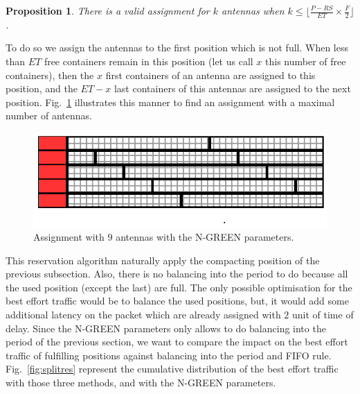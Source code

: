 \documentclass[10pt, conference, letterpaper]{IEEEtran}
\newtheorem{prop}{Proposition}
\begin{document}
\begin{prop}
 There is a valid assignment for $k$ antennas when $k \leq \lfloor \frac{P- RS}{ET} \times \frac{F}{2}\rfloor$.
\end{prop}


To do so we assign the antennas to the first position which is not full. When less than $ET$ free containers remain in this position (let us call $x$ this number of free containers), then the $x$ first containers of an antenna are assigned to this position, and the $ET - x$ last containers of this antennas are assigned to the next position. Fig.~\ref{fig:split} illustrates this manner to find an assignment with a maximal number of antennas. 


\begin{figure}[h!]
\begin{center}   

      \includegraphics[scale=0.8]{split}
     \caption{Assignment with $9$ antennas with the N-GREEN parameters.}   \label{fig:split}
\end{center}
  \end{figure}
  
  This reservation algorithm naturally apply the compacting position of the previous subsection. Also, there is no balancing into the period to do because all the used position (except the last) are full. The only possible optimisation for the best effort traffic would be to balance the used positions, but, it would add some additional latency on the packet which are already assigned with $2$ unit of time of delay.
  Since the N-GREEN parameters only allows to do balancing into the period of the previous section, we want to compare the impact on the best effort traffic of fulfilling positions against balancing into the period and FIFO rule. 
Fig.~\ref{fig:splitres} represent the cumulative distribution of the best effort traffic with those three methods, and with the N-GREEN parameters.
\end{document}
